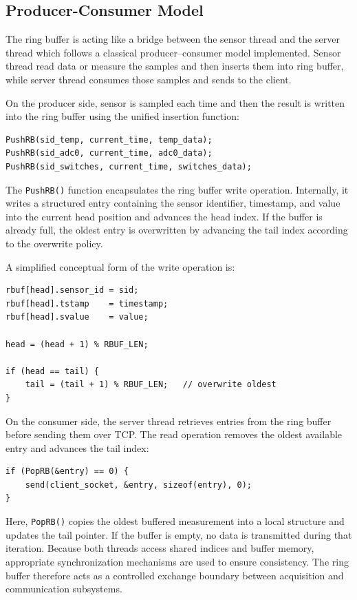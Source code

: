 \subsection{Producer-Consumer Model}
The ring buffer is acting like a bridge between the sensor thread and the server thread which follows  a classical producer–consumer model implemented. Sensor thread read data or measure the samples and then inserts them into ring buffer, while server thread consumes those samples and sends to the client. 

On the producer side, sensor is sampled each time and then the result is written into the ring buffer using the unified insertion function:

\begin{verbatim}
PushRB(sid_temp, current_time, temp_data);
PushRB(sid_adc0, current_time, adc0_data);
PushRB(sid_switches, current_time, switches_data);
\end{verbatim}

The \texttt{PushRB()} function encapsulates the ring buffer write operation. Internally, it writes a structured entry containing the sensor identifier, timestamp, and value into the current head position and advances the head index. If the buffer is already full, the oldest entry is overwritten by advancing the tail index according to the overwrite policy.

A simplified conceptual form of the write operation is:

\begin{verbatim}
rbuf[head].sensor_id = sid;
rbuf[head].tstamp    = timestamp;
rbuf[head].svalue    = value;

head = (head + 1) % RBUF_LEN;

if (head == tail) {
    tail = (tail + 1) % RBUF_LEN;   // overwrite oldest
}
\end{verbatim}
On the consumer side, the server thread retrieves entries from the ring buffer before sending them over TCP. The read operation removes the oldest available entry and advances the tail index:

\begin{verbatim}
if (PopRB(&entry) == 0) {
    send(client_socket, &entry, sizeof(entry), 0);
}
\end{verbatim}

Here, \texttt{PopRB()} copies the oldest buffered measurement into a local structure and updates the tail pointer. If the buffer is empty, no data is transmitted during that iteration.
Because both threads access shared indices and buffer memory, appropriate synchronization mechanisms are used to ensure consistency. The ring buffer therefore acts as a controlled exchange boundary between acquisition and communication subsystems.


